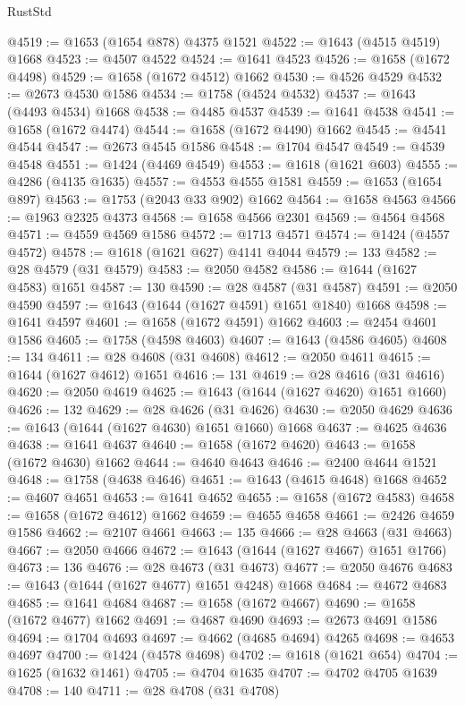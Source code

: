 \begin{lexlean}{RustStd}
\begin{coremodule}
@4519 := @1653 (@1654 @878) @4375 @1521
@4522 := @1643 (@4515 @4519) @1668
@4523 := @4507 @4522
@4524 := @1641 @4523
@4526 := @1658 (@1672 @4498)
@4529 := @1658 (@1672 @4512) @1662
@4530 := @4526 @4529
@4532 := @2673 @4530 @1586
@4534 := @1758 (@4524 @4532)
@4537 := @1643 (@4493 @4534) @1668
@4538 := @4485 @4537
@4539 := @1641 @4538
@4541 := @1658 (@1672 @4474)
@4544 := @1658 (@1672 @4490) @1662
@4545 := @4541 @4544
@4547 := @2673 @4545 @1586
@4548 := @1704 @4547
@4549 := @4539 @4548
@4551 := @1424 (@4469 @4549)
@4553 := @1618 (@1621 @603)
@4555 := @4286 (@4135 @1635)
@4557 := @4553 @4555 @1581
@4559 := @1653 (@1654 @897)
@4563 := @1753 (@2043 @33 @902) @1662
@4564 := @1658 @4563
@4566 := @1963 @2325 @4373
@4568 := @1658 @4566 @2301
@4569 := @4564 @4568
@4571 := @4559 @4569 @1586
@4572 := @1713 @4571
@4574 := @1424 (@4557 @4572)
@4578 := @1618 (@1621 @627) @4141 @4044
@4579 := 133
@4582 := @28 @4579 (@31 @4579)
@4583 := @2050 @4582
@4586 := @1644 (@1627 @4583) @1651
@4587 := 130
@4590 := @28 @4587 (@31 @4587)
@4591 := @2050 @4590
@4597 := @1643 (@1644 (@1627 @4591) @1651 @1840) @1668
@4598 := @1641 @4597
@4601 := @1658 (@1672 @4591) @1662
@4603 := @2454 @4601 @1586
@4605 := @1758 (@4598 @4603)
@4607 := @1643 (@4586 @4605)
@4608 := 134
@4611 := @28 @4608 (@31 @4608)
@4612 := @2050 @4611
@4615 := @1644 (@1627 @4612) @1651
@4616 := 131
@4619 := @28 @4616 (@31 @4616)
@4620 := @2050 @4619
@4625 := @1643 (@1644 (@1627 @4620) @1651 @1660)
@4626 := 132
@4629 := @28 @4626 (@31 @4626)
@4630 := @2050 @4629
@4636 := @1643 (@1644 (@1627 @4630) @1651 @1660) @1668
@4637 := @4625 @4636
@4638 := @1641 @4637
@4640 := @1658 (@1672 @4620)
@4643 := @1658 (@1672 @4630) @1662
@4644 := @4640 @4643
@4646 := @2400 @4644 @1521
@4648 := @1758 (@4638 @4646)
@4651 := @1643 (@4615 @4648) @1668
@4652 := @4607 @4651
@4653 := @1641 @4652
@4655 := @1658 (@1672 @4583)
@4658 := @1658 (@1672 @4612) @1662
@4659 := @4655 @4658
@4661 := @2426 @4659 @1586
@4662 := @2107 @4661
@4663 := 135
@4666 := @28 @4663 (@31 @4663)
@4667 := @2050 @4666
@4672 := @1643 (@1644 (@1627 @4667) @1651 @1766)
@4673 := 136
@4676 := @28 @4673 (@31 @4673)
@4677 := @2050 @4676
@4683 := @1643 (@1644 (@1627 @4677) @1651 @4248) @1668
@4684 := @4672 @4683
@4685 := @1641 @4684
@4687 := @1658 (@1672 @4667)
@4690 := @1658 (@1672 @4677) @1662
@4691 := @4687 @4690
@4693 := @2673 @4691 @1586
@4694 := @1704 @4693
@4697 := @4662 (@4685 @4694) @4265
@4698 := @4653 @4697
@4700 := @1424 (@4578 @4698)
@4702 := @1618 (@1621 @654)
@4704 := @1625 (@1632 @1461)
@4705 := @4704 @1635
@4707 := @4702 @4705 @1639
@4708 := 140
@4711 := @28 @4708 (@31 @4708)

\end{coremodule}
\end{lexlean}

